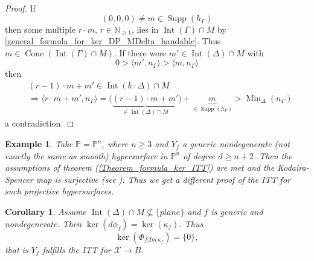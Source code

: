 \documentclass[12pt, english]{article}
\newtheorem{corollar}[definition]{Corollary}
\newtheorem{example}[definition]{Example}
\DeclareMathOperator{\Int}{Int}
\DeclareMathOperator{\Min}{Min}
\DeclareMathOperator{\Supp}{Supp}
\DeclareMathOperator{\Cone}{Cone}
\begin{document}
\begin{proof}
	If 
	\[ (0,0,0) \neq m \in \Supp(h_{\Gamma})  \]
	then some multiple $r \cdot m$, $r \in \mathbb{N}_{\geq 1}$, lies in $\Int(\Gamma) \cap M$ by \ref{general_formula_for_ker_DP_MDelta_handable}. Thus $m \in \Cone(\Int(\Gamma) \cap M)$. If there were $m' \in \Int(\Delta) \cap M$ with
	\[ 0 > \langle m', n_{\Gamma} \rangle > \langle m,n_{\Gamma} \rangle  \]
	then
	\begin{align*}
		& (r - 1) \cdot m + m' \in \Int(k \cdot \Delta) \cap M \\
		& \Rightarrow \langle  r \cdot m + m', n_{\Gamma} \rangle = \Big( \underbrace{(r-1) \cdot m + m'}_{\in \Int(\Delta) \cap M} \Big) + \underbrace{m}_{\in \Supp(h_{\Gamma})}  > \Min_{\Delta}(n_{\Gamma})
	\end{align*}
	a contradiction.	
\end{proof}

























\begin{example}
	\normalfont	
	Take $\mathbb{P} = \mathbb{P}^n$, where $n \geq 3$ and $Y_f$ a generic nondegenerate (not exactly the same as smooth) hypersurface in $\mathbb{P}^n$ of degree $d \geq n+2$. Then the assumptions of theorem (\ref{Theorem_formula_ker_ITT}) are met and the Kodaira-Spencer map is surjective (see \cite[Lemma 6.15]{Voi03}). Thus we get a different proof of the ITT for such projective hypersurfaces.
\end{example}


\begin{corollar} \label{corollary_inf_Tor_thm}
	Assume $\Int(\Delta) \cap M \nsubseteq \{plane\}$ and $f$ is generic and nondegenerate. Then $\ker(d \phi_f) = \ker(\kappa_f)$. Thus
	\[  \ker(\Phi_{f \vert{Im \, \kappa_f}}) = \{ 0  \},  \]
	that is $Y_f$ fulfills the ITT for $\mathcal{X} \rightarrow B$. 
\end{corollar}
\end{document}
